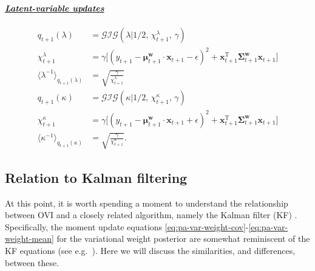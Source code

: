 \paragraph{\underline{\it{Latent-variable updates}}}
\begin{align}
	q_{t+1}(\lambda)
	&= \mathcal{GIG}(\lambda|1/2,\, \chi_{t+1}^\lambda,\, \gamma)
	\label{eq:variational-lambda-posterior-final} \\
	\chi_{t+1}^\lambda
	&= \gamma\big[(y_{t+1} - \boldsymbol{\mu}_{t+1}^\mathbf{w}\cdot\mathbf{x}_{t+1} - \epsilon)^2 + \mathbf{x}_{t+1}^\text{T}\boldsymbol{\Sigma}_{t+1}^\mathbf{w}\mathbf{x}_{t+1}\big]
	\\
	\langle\lambda^{-1}\rangle_{q_{t+1}(\lambda)}
	&= \sqrt{\frac{\gamma}{\chi_{t+1}^{\lambda}}}
	\label{eq:pa-var-lambda-mean-inverse} \\
	q_{t+1}(\kappa)
	&= \mathcal{GIG}(\kappa|1/2,\, \chi_{t+1}^\kappa,\, \gamma)
	\label{eq:variational-kappa-posterior-final} \\
	\chi_{t+1}^\kappa
	&= \gamma\big[(y_{t+1} - \boldsymbol{\mu}_{t+1}^\mathbf{w}\cdot\mathbf{x}_{t+1} + \epsilon)^2 + \mathbf{x}_{t+1}^\text{T}\boldsymbol{\Sigma}_{t+1}^\mathbf{w}\mathbf{x}_{t+1}\big]
	\\
	\langle\kappa^{-1}\rangle_{q_{t+1}(\kappa)}
	&= \sqrt{\frac{\gamma}{\chi_{t+1}^{\kappa}}}.
	\label{eq:pa-var-kappa-mean-inverse}
\end{align}

\subsection{Relation to Kalman filtering}
\label{sec:relation-to-kf}

%
At this point, it is worth spending a moment to understand the relationship between OVI and a closely related algorithm, namely the Kalman filter (KF) \citep{kalman}.
Specifically, the moment update equations \eqref{eq:pa-var-weight-cov}-\eqref{eq:pa-var-weight-mean} for the variational weight posterior are somewhat reminiscent of the KF equations (see e.g.\ \citep[p.~639]{bishop06}). Here we will discuss the similarities, and differences, between these.

